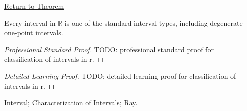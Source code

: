 \newpage
{}
\label{prf:classification-of-intervals-in-r}

\begin{remark*}[Return]
\hyperref[thm:classification-of-intervals-in-r]{Return to Theorem}
\end{remark*}

\begin{theorem*}
Every interval in $\mathbb{R}$ is one of the standard interval types, including
degenerate one-point intervals.
\end{theorem*}

\begin{proof}[Professional Standard Proof]
\LRAProofBodyStart
TODO: professional standard proof for classification-of-intervals-in-r.
\end{proof}

\begin{proof}[Detailed Learning Proof]
\LRAProofBodyStart
TODO: detailed learning proof for classification-of-intervals-in-r.
\end{proof}

\begin{remark*}
\end{remark*}

\begin{dependencies}
\hyperref[def:interval]{Interval};
\hyperref[thm:interval-characterization]{Characterization of Intervals};
\hyperref[def:ray]{Ray}.
\end{dependencies}

\clearpage
